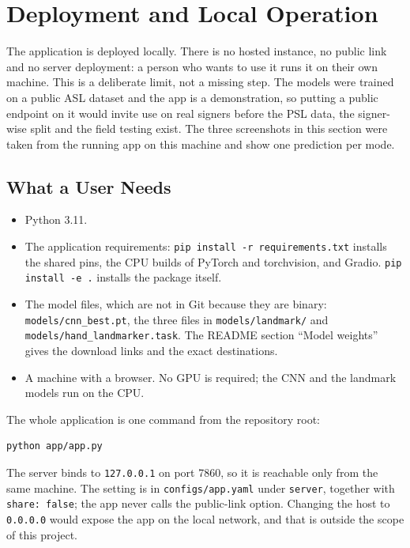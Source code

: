 \section{Deployment and Local Operation}
\label{sec:deployment}

The application is deployed locally. There is no hosted instance, no public link and no server deployment: a person who wants to use it runs it on their own machine. This is a deliberate limit, not a missing step. The models were trained on a public ASL dataset and the app is a demonstration, so putting a public endpoint on it would invite use on real signers before the PSL data, the signer-wise split and the field testing exist. The three screenshots in this section were taken from the running app on this machine and show one prediction per mode.

\subsection{What a User Needs}

\begin{itemize}
\item Python 3.11.
\item The application requirements: \texttt{pip install -r requirements.txt} installs the shared pins, the CPU builds of PyTorch and torchvision, and Gradio. \texttt{pip install -e .} installs the package itself.
\item The model files, which are not in Git because they are binary: \texttt{models/cnn\_best.pt}, the three files in \texttt{models/landmark/} and \texttt{models/hand\_landmarker.task}. The README section ``Model weights'' gives the download links and the exact destinations.
\item A machine with a browser. No GPU is required; the CNN and the landmark models run on the CPU.
\end{itemize}

The whole application is one command from the repository root:

\begin{verbatim}
python app/app.py
\end{verbatim}

The server binds to \texttt{127.0.0.1} on port 7860, so it is reachable only from the same machine. The setting is in \texttt{configs/app.yaml} under \texttt{server}, together with \texttt{share: false}; the app never calls the public-link option. Changing the host to \texttt{0.0.0.0} would expose the app on the local network, and that is outside the scope of this project.


